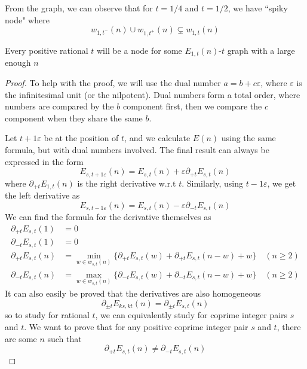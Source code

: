 \documentclass[]{article}
\begin{document}
From the graph, we can observe that for $t = 1/4$ and $t = 1/2$, we have ``spiky node" where
\[
 w_{1,t^-}(n) \cup w_{1,t^+}(n)  \subsetneq w_{1,t}(n)
\]

\vspace{1cm}
\begin{lemma}[Node] 
	Every positive rational $t$ will be a node for some $E_{1,t}(n)$-$t$ graph with a large enough $n$
\end{lemma}
\begin{proof}
	To help with the proof, we will use the dual number $a = b + c\varepsilon $, where $\varepsilon$ is the infinitesimal unit (or the nilpotent). Dual numbers form a total order, where numbers are compared by the $b$ component first, then we compare the $c$ component when they share the same $b$. 
	
	Let $t + 1\varepsilon$ be at the position of $t$, and we calculate $E(n)$ using the same formula, but with dual numbers involved. The final result can always be expressed in the form
	\[
	E_{s,t + 1\varepsilon}(n) = E_{s,t}(n) + \varepsilon \partial_{+t}E_{s,t}(n) 
	\]
	where $\partial_{+t}E_{1,t}(n)  $ is the right derivative w.r.t $t$. Similarly, using $t - 1\varepsilon$, we get the left derivative as 
	\[
	E_{s,t - 1\varepsilon}(n) = E_{s,t}(n) - \varepsilon \partial_{-t}E_{s,t}(n) 
	\]
	We can find the formula for the derivative themselves as
	\begin{align*}
	\partial_{+t}E_{s,t}(1) &= 0\\
	 \partial_{-t}E_{s,t}(1) &= 0 \\
	 \partial_{+t}E_{s,t}(n) &= \min_{w\in w_{s,t}(n)}\{\partial_{+t}E_{s,t}(w) + \partial_{+t}E_{s,t}(n-w) + w\} \quad(n\geq 2)\\
	 \partial_{-t}E_{s,t}(n) &= \max_{w\in w_{s,t}(n)}\{\partial_{-t}E_{s,t}(w) + \partial_{-t}E_{s		,t}(n-w) + w\} \quad(n\geq 2)
	\end{align*}
	It can also easily be proved that the derivatives are also homogeneous
	\[
	\partial_{\pm t}E_{ks,kt}(n) = \partial_{\pm t}E_{s,t}(n)
	\]
	so to study for rational $t$, we can equivalently study for coprime integer pairs $s$ and $t$. We want to prove that for any positive coprime integer pair $s$ and $t$, there are some $n$ such that
	\[
	\partial_{+t}E_{s,t}(n) \neq \partial_{-t}E_{s,t}(n) 
	\]
	

\end{proof}
\end{document}
